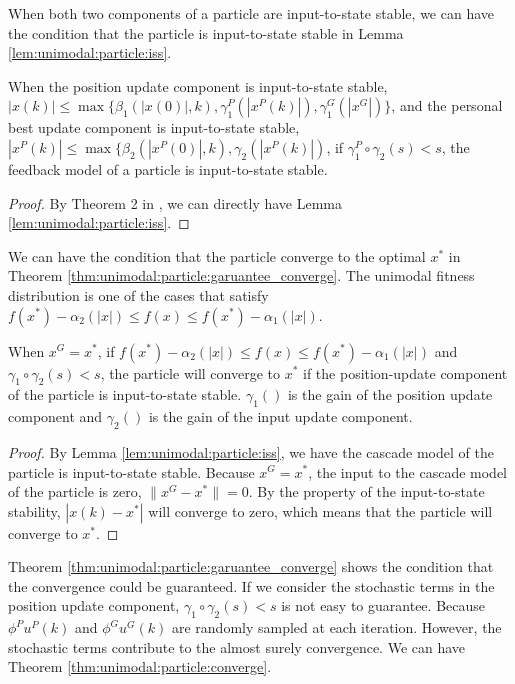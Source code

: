 When both two components of a particle are input-to-state stable, we can have the condition that the particle is input-to-state stable in Lemma \ref{lem:unimodal:particle:iss}.

\begin{mylem}
\label{lem:unimodal:particle:iss}
When the position update component is input-to-state stable,
$ | x (k) | \leq \max \{ \beta_{1} (| x(0) |, k ), \gamma^{P}_{1} ( | x^{P} (k) | ), \gamma^{G}_{1} ( | x^{G} | ) \} $,
and the personal best update component is input-to-state stable,
$ | x^{P} (k) | \leq \max \{ \beta_{2} (| x^{P}(0) |, k ), \gamma_{2} ( | x^{P} (k) | ) $,
if $ \gamma^{P}_{1} \circ \gamma_{2} (s)  < s $, the feedback model of a particle is input-to-state stable.
\begin{proof}
By Theorem 2 in \cite{Jiang2001857}, we can directly have Lemma \ref{lem:unimodal:particle:iss}.
\end{proof}
\end{mylem}

We can have the condition that the particle converge to the optimal $ x^{*} $ in Theorem \ref{thm:unimodal:particle:garuantee_converge}.
The unimodal fitness distribution is one of the cases that satisfy $ f(x^{*}) - \alpha_{2} ( |x| ) \leq  f(x) \leq f(x^{*}) - \alpha_{1} ( |x| ) $.

\begin{mythm}
\label{thm:unimodal:particle:garuantee_converge}
When $ x^{G} = x^{*} $,  if $ f(x^{*}) - \alpha_{2} ( |x| ) \leq  f(x) \leq f(x^{*}) - \alpha_{1} ( |x| ) $ and $ \gamma_{1} \circ \gamma_{2} (s)  < s $, the particle will converge to $ x^{*} $ if the position-update component of the particle is input-to-state stable.
$ \gamma_{1} () $ is the gain of the position update component and $ \gamma_{2} () $ is the gain of the input update component.
\begin{proof}
By Lemma \ref{lem:unimodal:particle:iss}, we have the cascade model of the particle is input-to-state stable.
Because $ x^{G} = x^{*} $, the input to the cascade model of the particle is zero, $ \lVert x^{G} - x^{*} \rVert = 0 $.
By the property of the input-to-state stability, $ | x(k) - x^{*} | $ will converge to zero, which means that the particle will converge to $ x^{*} $.
\end{proof}
\end{mythm}

Theorem \ref{thm:unimodal:particle:garuantee_converge} shows the condition that the convergence could be guaranteed.
If we consider the stochastic terms in the position update component, $ \gamma_{1} \circ \gamma_{2} (s)  < s $ is not easy to guarantee.
Because $ \phi^{P} u^{P} (k) $ and $  \phi^{G} u^{G} (k)  $ are randomly sampled at each iteration.
However, the stochastic terms contribute to the almost surely convergence.
We can have Theorem \ref{thm:unimodal:particle:converge}.

